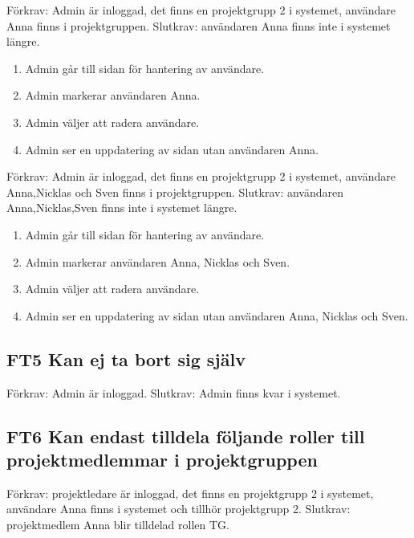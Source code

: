 \documentclass[paper=a4, fontsize=11pt,twoside]{article}
\begin{document}
	Förkrav: Admin är inloggad, det finns en projektgrupp 2 i systemet, användare 
	Anna finns i projektgruppen.
	\newline
	Slutkrav: användaren Anna finns inte i systemet längre.
	
	\begin{enumerate}
	 \item Admin går till sidan för hantering av användare.
   \item Admin markerar användaren Anna.
   \item Admin väljer att radera användare.
   \item Admin ser en uppdatering av sidan utan användaren Anna.
	  
	\end{enumerate}
	
	Förkrav: Admin är inloggad, det finns en projektgrupp 2 i systemet, användare 
	Anna,Nicklas och Sven finns i projektgruppen.
	\newline
	Slutkrav: användaren Anna,Nicklas,Sven  finns inte i systemet längre.
	
	\begin{enumerate}
	\item  Admin går till sidan för hantering av användare.
    \item Admin markerar användaren Anna, Nicklas och Sven.
    \item Admin väljer att radera användare.
    \item Admin ser en uppdatering av sidan utan användaren Anna, Nicklas och
  Sven.
	  
	\end{enumerate}
	
	\subsection*{FT5 Kan ej ta bort sig själv }
	
	Förkrav: Admin är inloggad.
	\newline
	Slutkrav: Admin finns kvar i systemet.
	
	
	\subsection*{FT6 Kan endast tilldela följande roller till projektmedlemmar i projektgruppen }
	
	Förkrav: projektledare är inloggad, det finns en projektgrupp 2 i systemet, användare  Anna finns i systemet och tillhör projektgrupp 2. 
	\newline
	Slutkrav: projektmedlem Anna blir tilldelad  rollen TG.
	
\end{document}
